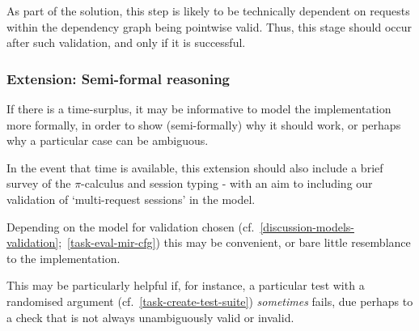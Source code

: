 As part of the solution, this step is likely to be technically dependent on requests within the dependency graph being pointwise valid. Thus, this stage should occur after such validation, and only if it is successful.

\subsubsection{Extension: Semi-formal reasoning}
If there is a time-surplus, it may be informative to model the implementation more formally, in order to show (semi-formally) why it should work, or perhaps why a particular case can be ambiguous.
\begin{task}
	\taskrisks{-}
\end{task}

In the event that time is available, this extension should also include a brief survey of the $\pi$-calculus and session typing - with an aim to including our validation of `multi-request sessions' in the model.

Depending on the model for validation chosen (cf.~\ref{discussion-models-validation};~\ref{task-eval-mir-cfg}) this may be convenient, or bare little resemblance to the implementation.

This may be particularly helpful if, for instance, a particular test with a randomised argument (cf.~\ref{task-create-test-suite}) \emph{sometimes} fails, due perhaps to a check that is not always unambiguously valid or invalid.
